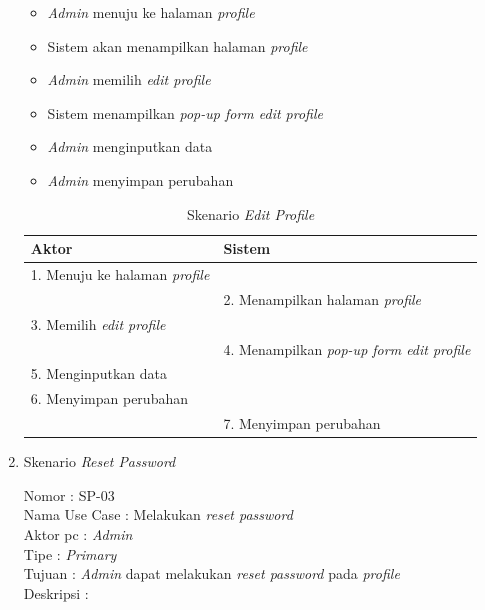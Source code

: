 \begin{enumerate}
\begin{itemize}
	\item \textit{Admin} menuju ke halaman \textit{profile}
	\item Sistem akan menampilkan halaman \textit{profile}
	\item \textit{Admin} memilih \textit{edit profile}
	\item Sistem menampilkan \textit{pop-up form edit profile}
	\item \textit{Admin} menginputkan data
	\item \textit{Admin} menyimpan perubahan

\end{itemize}

\begin{table}
	\caption{Skenario \textit{Edit Profile}}
	\centering
	\begin{tabular}{ | l | l |}
		\hline 
		\textbf{Aktor} & \textbf{Sistem} \\
		\hline
		
		1.	Menuju ke halaman \textit{profile} &  \\
		
		\hline
		
		&  2.	Menampilkan halaman \textit{profile} \\
		
		\hline
		
		 3. Memilih \textit{edit profile} & \\
		
		\hline
		
			& 4.	Menampilkan\textit{ pop-up form edit profile} \\
		
		\hline
		
		5.	Menginputkan data  & \\
		\hline
		
		6.	Menyimpan perubahan & \\
		\hline
		
		& 7.	Menyimpan perubahan \\
		\hline
		
	\end{tabular}
\end{table}

\item Skenario \textit{Reset Password}

Nomor \kern 3.6pc : SP-03 \\
Nama Use Case : Melakukan \textit{reset password} \\
Aktor  pc : \textit{Admin} \\
Tipe \kern 4.6pc : \textit{Primary} \\
Tujuan \kern 3.6pc : \textit{Admin} dapat melakukan \textit{reset password} pada \textit{profile} \\
Deskripsi \kern 2.5pc : 


\end{enumerate}
